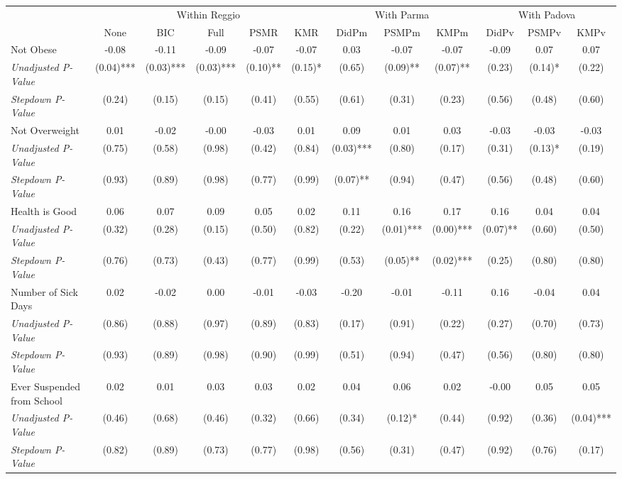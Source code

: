 \begin{tabular}{l c c c c c c c c c c c}
\toprule
& \multicolumn{5}{c}{Within Reggio} & \multicolumn{3}{c}{With Parma} & \multicolumn{3}{c}{With Padova} \\\cmidrule(lr){2-6} \cmidrule(lr){7-9} \cmidrule(lr){10-12}
 & None & BIC & Full & PSMR & KMR & DidPm & PSMPm & KMPm & DidPv & PSMPv & KMPv \\
\midrule
Not Obese & -0.08 & -0.11 & -0.09 & -0.07 & -0.07 & 0.03 & -0.07 & -0.07 & -0.09 & 0.07 & 0.07 \\
\quad \textit{Unadjusted P-Value} & (0.04)*** & (0.03)*** & (0.03)*** & (0.10)** & (0.15)* & (0.65) & (0.09)** & (0.07)** & (0.23) & (0.14)* & (0.22) \\
\quad \textit{Stepdown P-Value} & (0.24) & (0.15) & (0.15) & (0.41) & (0.55) & (0.61) & (0.31) & (0.23) & (0.56) & (0.48) & (0.60) \\
Not Overweight & 0.01 & -0.02 & -0.00 & -0.03 & 0.01 & 0.09 & 0.01 & 0.03 & -0.03 & -0.03 & -0.03 \\
\quad \textit{Unadjusted P-Value} & (0.75) & (0.58) & (0.98) & (0.42) & (0.84) & (0.03)*** & (0.80) & (0.17) & (0.31) & (0.13)* & (0.19) \\
\quad \textit{Stepdown P-Value} & (0.93) & (0.89) & (0.98) & (0.77) & (0.99) & (0.07)** & (0.94) & (0.47) & (0.56) & (0.48) & (0.60) \\
Health is Good & 0.06 & 0.07 & 0.09 & 0.05 & 0.02 & 0.11 & 0.16 & 0.17 & 0.16 & 0.04 & 0.04 \\
\quad \textit{Unadjusted P-Value} & (0.32) & (0.28) & (0.15) & (0.50) & (0.82) & (0.22) & (0.01)*** & (0.00)*** & (0.07)** & (0.60) & (0.50) \\
\quad \textit{Stepdown P-Value} & (0.76) & (0.73) & (0.43) & (0.77) & (0.99) & (0.53) & (0.05)** & (0.02)*** & (0.25) & (0.80) & (0.80) \\
Number of Sick Days & 0.02 & -0.02 & 0.00 & -0.01 & -0.03 & -0.20 & -0.01 & -0.11 & 0.16 & -0.04 & 0.04 \\
\quad \textit{Unadjusted P-Value} & (0.86) & (0.88) & (0.97) & (0.89) & (0.83) & (0.17) & (0.91) & (0.22) & (0.27) & (0.70) & (0.73) \\
\quad \textit{Stepdown P-Value} & (0.93) & (0.89) & (0.98) & (0.90) & (0.99) & (0.51) & (0.94) & (0.47) & (0.56) & (0.80) & (0.80) \\
Ever Suspended from School & 0.02 & 0.01 & 0.03 & 0.03 & 0.02 & 0.04 & 0.06 & 0.02 & -0.00 & 0.05 & 0.05 \\
\quad \textit{Unadjusted P-Value} & (0.46) & (0.68) & (0.46) & (0.32) & (0.66) & (0.34) & (0.12)* & (0.44) & (0.92) & (0.36) & (0.04)*** \\
\quad \textit{Stepdown P-Value} & (0.82) & (0.89) & (0.73) & (0.77) & (0.98) & (0.56) & (0.31) & (0.47) & (0.92) & (0.76) & (0.17) \\
\bottomrule
\end{tabular}
